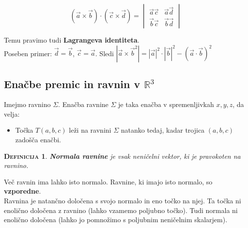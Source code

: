 \documentclass[a4paper,12pt]{article}
\newtheorem*{definicija}{\textsc{Definicija}}
\begin{document}
$$ (\vec{a}\times \vec{b})\cdot (\vec{c}\times \vec{d}) =
\begin{vmatrix}
	\vec{a}\vec{c} & \vec{a}\vec{d} \\
	\vec{b}\vec{c} & \vec{b}\vec{d}
\end{vmatrix} $$

Temu pravimo tudi \textbf{Lagrangeva identiteta}. \\

Poseben primer: $\vec{d}=\vec{b}$, $\vec{c}=\vec{a}$. Sledi $|\vec{a}\times \vec{b}^2|=|\vec{a}|^2 \cdot |\vec{b}|^2-(\vec{a}\cdot \vec{b})^2$

\newpage

\begin{center}
\section{Enačbe premic in ravnin v $\mathbb{R}^3$}
\end{center}

Imejmo ravnino $\Sigma$. Enačba ravnine $\Sigma$ je taka enačba v spremenljivkah $x,y,z$, da velja: \\

\begin{itemize}
\item Točka $T(a,b,c)$ leži na ravnini $\Sigma$ natanko tedaj, kadar trojica $(a,b,c)$ zadošča enačbi.\\
\end{itemize}

\begin{definicija}
\textbf{Normala ravnine} je vsak neničelni vektor, ki je pravokoten na ravnino.\\
\end{definicija}
 
Več ravnin ima lahko isto normalo. Ravnine, ki imajo isto normalo, so \textbf{vzporedne}. \\

Ravnina je natančno določena s svojo normalo in eno točko na njej. Ta točka ni enolično določena z ravnino (lahko vzamemo poljubno točko). Tudi normala ni enolično določena (lahko jo pomnožimo s poljubnim neničelnim skalarjem). \\
\end{document}
